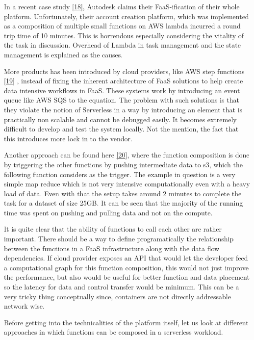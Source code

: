 \documentclass[12pt,titlepage]{article}
\begin{document}
In a recent case study \hyperref[ref:18]{[18}], Autodesk claims their FaaS-ification of
their whole platform. Unfortunately, their account creation platform, which was
implemented as a composition of multiple small functions on AWS lambda incurred
a round trip time of 10 minutes. This is horrendous especially considering the
vitality of the task in discussion. Overhead of Lambda in task management and
the state management is explained as the causes.

More products has been introduced by cloud providers, like AWS step functions \hyperref[ref:19]{[19}]
, instead of fixing the inherent architecture of FaaS
solutions to help create data intensive workflows in FaaS. These systems work by
introducing an event queue like AWS SQS to the equation. The problem with such
solutions is that they violate the notion of Serverless in a way by introducing
an element that is practically non scalable and cannot be debugged easily. It
becomes extremely difficult to develop and test the system locally. Not
the mention, the fact that this introduces more lock in to the vendor.

Another approach can be found here \hyperref[ref:20]{[20}], where the function composition is
done by triggering the other functions by pushing intermediate data to s3, which
the following function considers as the trigger. The example in question is a
very simple map reduce which is not very intensive computationally even with a
heavy load of data. Even with that the setup takes around 2 minutes to complete
the task for a dataset of size 25GB. It can be seen that the majority of the
running time was spent on pushing and pulling data and not on the compute.

It is quite clear that the ability of functions to call each other are rather
important. There should be a way to define programatically the relationship
between the functions in a FaaS infrastructure along with the data flow
dependencies. If cloud provider exposes an API that would let the developer feed
a computational graph for this function composition, this would not just
improve the performance, but also would be useful for better function and data
placement so the latency for data and control transfer would be minimum. This
can be a very tricky thing conceptually since, containers are not directly
addressable network wise.

Before getting into the technicalities of the platform itself, let us look at
different approaches in which functions can be composed in a serverless
workload.
\end{document}
